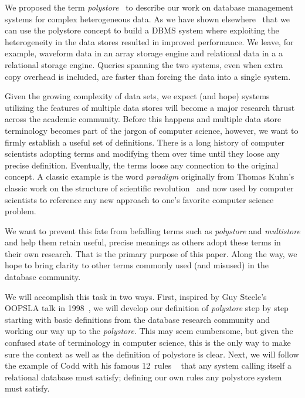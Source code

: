 \documentclass[conference]{IEEEtran}
\newcommand{\term}[1]{\emph{#1}}
\begin{document}
We proposed the term 
\term{polystore}~\cite{Duggan2015,Elmore2015demo,Gadepally2016}
to describe our work on database management systems for 
complex heterogeneous data.  As we have shown 
elsewhere~\cite{Elmore2015demo} that we can use the
polystore concept to build a DBMS system where exploiting the 
heterogeneity in the data stores resulted in improved performance.  
We leave, for example, waveform data in an array storage engine and 
relational data in a a relational storage engine. Queries spanning the 
two systems, even when extra copy overhead is included, are 
faster than forcing the data into a single system.

Given the growing complexity of data sets, we expect (and hope) 
systems utilizing the features of multiple data stores will
become a major research thrust across the academic community.
Before this happens and multiple data store terminology becomes 
part of the jargon of computer science, however, we want to 
firmly establish a useful set of definitions.   
There is a long history of computer scientists 
adopting terms and modifying them over time
until they loose any precise definition.  Eventually, 
the terms loose any connection to the original concept.  A classic 
example is the word \term{paradigm} originally from Thomas Kuhn's 
classic work on the structure of scientific revolution~\cite{Kuhn1962}  
and now used by computer scientists to reference any new 
approach to one's favorite computer science problem.

We want to prevent this fate from befalling terms such as
\term{polystore} and \term{multistore} and help them
retain useful, precise meanings as others adopt these terms 
in their own research.  That is the primary purpose of this paper.   
Along the way, we hope to bring clarity to other terms commonly used 
(and misused) in the database community.

We will accomplish this task in two ways.  First, inspired by Guy Steele's 
OOPSLA talk in 1998~\cite{Steele98}, we will develop our definition
of \term{polystore} step by step starting with basic definitions 
from the database research community and working our way up 
to the \term{polystore}.  This may seem cumbersome, but given the 
confused state of terminology in computer science, this is the only way 
to make sure the context as well as the definition of polystore is 
clear.  Next, we will follow the example of Codd with his 
famous 12~rules ~\cite{Codd85} that any system calling itself a 
relational database must satisfy; defining our own rules any 
polystore system must satisfy.
\end{document}
